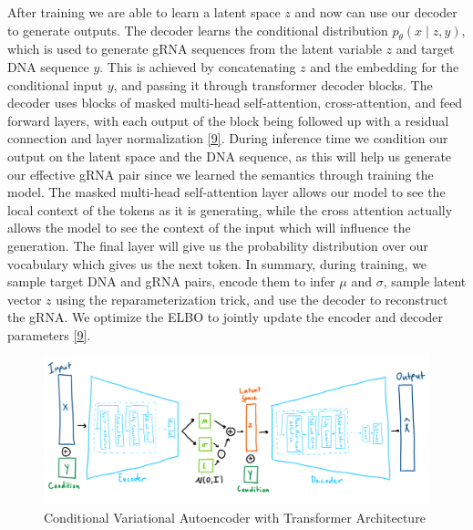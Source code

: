 \documentclass{article}
\begin{document}
After training we are able to learn a latent space $z$ and now can use our decoder to generate outputs. The decoder learns the conditional distribution $p_{\theta}(x \mid z, y)$, which is used to generate gRNA sequences from the latent variable $z$ and target DNA sequence $y$. This is achieved by concatenating $z$ and the embedding for the conditional input $y$, and passing it through transformer decoder blocks. The decoder uses blocks of masked multi-head self-attention, cross-attention, and feed forward layers, with each output of the block being followed up with a residual connection and layer normalization \hyperref[Reference 9]{[9]}. During inference time we condition our output on the latent space and the DNA sequence, as this will help us generate our effective gRNA pair since we learned the semantics through training the model. The masked multi-head self-attention layer allows our model to see the local context of the tokens as it is generating, while the cross attention actually allows the model to see the context of the input which will influence the generation. The final layer will give us the probability distribution over our vocabulary which gives us the next token. In summary, during training, we sample target DNA and gRNA pairs, encode them to infer $\mu$ and $\sigma$, sample latent vector $z$ using the reparameterization trick, and use the decoder to reconstruct the gRNA. We optimize the ELBO to jointly update the encoder and decoder parameters \hyperref[Reference 9]{[9]}.

\begin{figure}[H]
    \centering
    \begin{minipage}{\textwidth}
        \includegraphics[width=\linewidth]{Pictures/CVAE_Architecture.png} 
    \end{minipage}
    \caption{Conditional Variational Autoencoder with Transformer Architecture} 
\end{figure}
\end{document}

